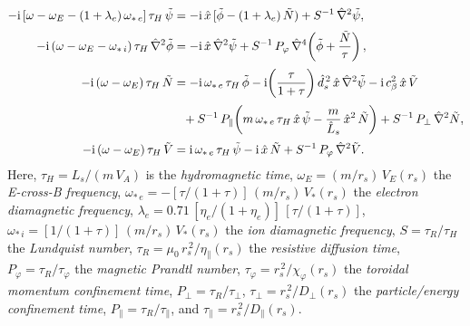 \documentclass[notitlepage,12pt]{article}
\begin{document}
\begin{align}\label{e301}
-{\rm i}\,[\omega-\omega_E -(1+\lambda_e)\,\omega_{\ast\,e}]\,\tau_H\,\tilde{\psi} &= -{\rm i} \,\hat{x}\,[\tilde{\phi}-(1+\lambda_e)\,\tilde{N}) + S^{-1}\,\hat{\nabla}^2\tilde{\psi},\\[0.5ex]
-{\rm i}\,(\omega-\omega_E-\omega_{\ast\,i})\,\tau_H\,\hat{\nabla}^2\tilde{\phi} &= -{\rm i}\,\hat{x}\,\hat{\nabla}^2\tilde{\psi}+S^{-1}\,P_\varphi\,\hat{\nabla}^4\!\left(\tilde{\phi} + \frac{\tilde{N}}{\tau}\right),\\[0.5ex]
-{\rm i}\,(\omega-\omega_E)\,\tau_H\,\tilde{N} &= -{\rm i}\,\omega_{\ast\,e}\,\tau_H\,\tilde{\phi} - {\rm i}\!\left(\frac{\tau}{1+\tau}\right)\hat{d}_s^{\,2}\,\hat{x}\,\hat{\nabla}^2\tilde{\psi} -{\rm i}\,c_\beta^2\,\hat{x}\,\tilde{V}\\[0.5ex]
&\phantom{=}
+S^{-1}\,P_\parallel\!\left(m\,\omega_{\ast\,e}\,\tau_H\,\hat{x}\,\tilde{\psi}-\frac{m}{\hat{L}_s}\,\hat{x}^2\,\tilde{N}\right)
+ S^{-1}\,P_\perp\,\hat{\nabla}^2 \tilde{N},\nonumber\\[0.5ex]
-{\rm i}\,(\omega-\omega_E)\,\tau_H\,\tilde{V} &= {\rm i}\,\omega_{\ast\,e}\,\tau_H\,\tilde{\psi} - {\rm i}\,\hat{x}\,\tilde{N}
+ S^{-1}\,P_\varphi\,\hat{\nabla}^2\tilde{V}.\label{e304}
\end{align}
Here, $\tau_H = L_s/(m\,V_A)$ is the {\em hydromagnetic time}, $\omega_E = (m/r_s)\,V_E(r_s)$  the 
{\em E-cross-B frequency}, $\omega_{\ast\,e} = -[\tau/(1+\tau)]\,(m/r_s)\,V_\ast(r_s)$  the {\em electron diamagnetic
frequency}, $\lambda_e = 0.71\,[\eta_e/(1+\eta_e)]\,[\tau/(1+\tau)]$, $\omega_{\ast\,i} = [1/(1+\tau)]\,(m/r_s)\,V_\ast(r_s)$  the {\em ion diamagnetic
frequency}, $S=\tau_R/\tau_H$ the {\em Lundquist number}, $\tau_R = \mu_0\,r_s^{\,2}/\eta_\parallel(r_s)$  the
{\em resistive diffusion time}, $P_\varphi = \tau_R/\tau_\varphi$ the {\em magnetic Prandtl number}, $\tau_\varphi
= r_s^{\,2}/\chi_\varphi(r_s)$  the {\em toroidal momentum confinement time}, $P_\perp = \tau_R/\tau_\perp$, 
$\tau_\perp = r_s^{\,2}/D_\perp(r_s)$  the {\em particle/energy confinement time}, 
$P_\parallel=\tau_R/\tau_\parallel$, and $\tau_\parallel =r_s^{\,2}/D_\parallel(r_s)$. 
\end{document}
